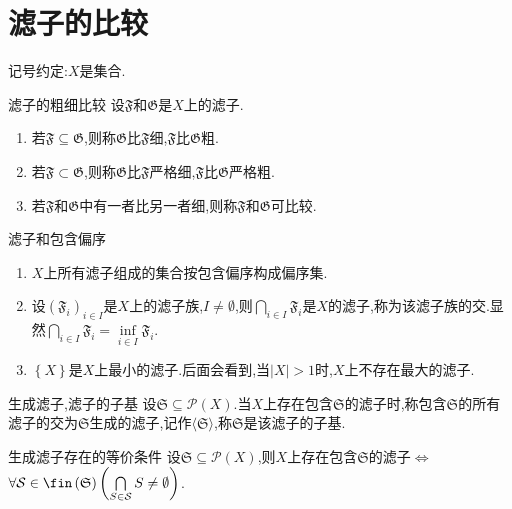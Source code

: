 \section{滤子的比较}

记号约定:$X$是集合.

\begin{definition}{滤子的粗细比较}{}
	设$\mathfrak{F}$和$\mathfrak{G}$是$X$上的滤子.
	\begin{enumerate}
		\item 若$\mathfrak{F}\subseteq\mathfrak{G}$,则称$\mathfrak{G}$比$\mathfrak{F}$细,$\mathfrak{F}$比$\mathfrak{G}$粗.
		\item 若$\mathfrak{F}\subset\mathfrak{G}$,则称$\mathfrak{G}$比$\mathfrak{F}$严格细,$\mathfrak{F}$比$\mathfrak{G}$严格粗.
		\item 若$\mathfrak{F}$和$\mathfrak{G}$中有一者比另一者细,则称$\mathfrak{F}$和$\mathfrak{G}$可比较.
	\end{enumerate}
\end{definition}

\begin{remark}{滤子和包含偏序}{}
	\begin{enumerate}
		\item $X$上所有滤子组成的集合按包含偏序构成偏序集.
		\item 设$\left(\mathfrak{F}_{i}\right)_{i\in I}$是$X$上的滤子族,$I\neq\emptyset$,则$\bigcap\limits_{i\in I}\mathfrak{F}_{i}$是$X$的滤子,称为该滤子族的交.显然$\bigcap\limits_{i\in I}\mathfrak{F}_{i}=\inf\limits_{i\in I}\mathfrak{F}_{i}$.
		\item $\left\{X\right\}$是$X$上最小的滤子.后面会看到,当$\left|X\right|>1$时,$X$上不存在最大的滤子.
	\end{enumerate}
\end{remark}

\begin{definition}{生成滤子,滤子的子基}{}
	设$\mathfrak{S}\subseteq\mathcal{P}\left(X\right)$.当$X$上存在包含$\mathfrak{S}$的滤子时,称包含$\mathfrak{S}$的所有滤子的交为$\mathfrak{S}$生成的滤子,记作$\langle\mathfrak{S}\rangle$,称$\mathfrak{S}$是该滤子的子基.
\end{definition}

\begin{proposition}{生成滤子存在的等价条件}{}
	设$\mathfrak{S}\subseteq\mathcal{P}\left(X\right)$,则$X$上存在包含$\mathfrak{S}$的滤子$\iff$ $\forall\mathcal{S}\in\fin\left(\mathfrak{S}\right)\left(\bigcap\limits_{S\in\mathcal{S}}S\neq\emptyset\right)$.
\end{proposition}

